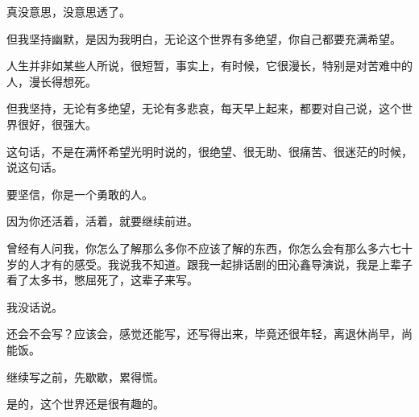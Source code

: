 \begin{multicols}{\theparacolNo}
真没意思，没意思透了。

但我坚持幽默，是因为我明白，无论这个世界有多绝望，你自己都要充满希望。

人生并非如某些人所说，很短暂，事实上，有时候，它很漫长，特别是对苦难中的人，漫长得想死。

但我坚持，无论有多绝望，无论有多悲哀，每天早上起来，都要对自己说，这个世界很好，很强大。

这句话，不是在满怀希望光明时说的，很绝望、很无助、很痛苦、很迷茫的时候，说这句话。

要坚信，你是一个勇敢的人。

因为你还活着，活着，就要继续前进。

曾经有人问我，你怎么了解那么多你不应该了解的东西，你怎么会有那么多六七十岁的人才有的感受。我说我不知道。跟我一起排话剧的田沁鑫导演说，我是上辈子看了太多书，憋屈死了，这辈子来写。

我没话说。

还会不会写？应该会，感觉还能写，还写得出来，毕竟还很年轻，离退休尚早，尚能饭。

继续写之前，先歇歇，累得慌。

是的，这个世界还是很有趣的。


\end{multicols}
